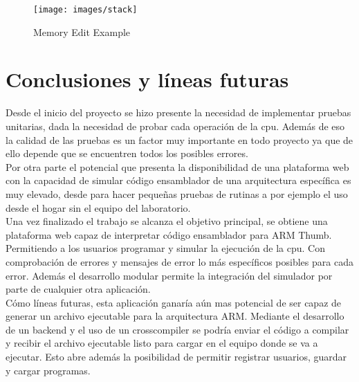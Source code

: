 {{            %


            \begin{figure}[h]
                \centering
                \texttt{[image: images/stack]}
                \caption{Memory Edit Example}
            \end{figure}
        }
    }

\section{Conclusiones y líneas futuras}
{
    Desde el inicio del proyecto se hizo presente la necesidad de implementar pruebas unitarias,
    dada la necesidad de probar cada operación de la cpu. Además de eso la calidad de las pruebas es un factor
    muy importante en todo proyecto ya que de ello depende que se encuentren todos los posibles errores. \\

    Por otra parte el potencial que presenta la disponibilidad de una plataforma web con la capacidad
    de simular código ensamblador de una arquitectura específica es muy elevado, desde para hacer
    pequeñas pruebas de rutinas a por ejemplo el uso desde el hogar sin el equipo del laboratorio. \\

    Una vez finalizado el trabajo se alcanza el objetivo principal, se obtiene una plataforma web
    capaz de interpretar código ensamblador para ARM Thumb. Permitiendo a los usuarios
    programar y simular la ejecución de la cpu. Con comprobación de errores y mensajes de error lo más
    específicos posibles para cada error. Además el desarrollo modular permite la integración del simulador
    por parte de cualquier otra aplicación. \\

    Cómo líneas futuras, esta aplicación ganaría aún mas potencial de ser capaz de generar un archivo
    ejecutable para la arquitectura ARM. Mediante el desarrollo de un backend y el uso de un crosscompiler
    se podría enviar el código a compilar y recibir el archivo ejecutable listo para cargar en el equipo donde se
    va a ejecutar. Esto abre además la posibilidad de permitir registrar usuarios, guardar y cargar programas.  
}

